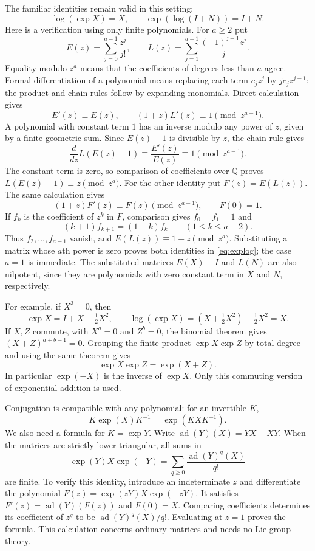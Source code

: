 \documentclass[11pt]{article}
\numberwithin{equation}{section}
\theoremstyle{definition}
\theoremstyle{remark}
\newcommand{\Q}{\mathbb Q}
\newcommand{\ad}{\operatorname{ad}}
\begin{document}
The familiar identities remain valid in this setting:
\begin{equation}\label{eq:explog}
\log(\exp X)=X,\qquad \exp(\log(I+N))=I+N.
\end{equation}
Here is a verification using only finite polynomials. For $a\ge2$ put
\[
E(z)=\sum_{j=0}^{a-1}\frac{z^j}{j!},
\qquad
L(z)=\sum_{j=1}^{a-1}\frac{(-1)^{j+1}z^j}{j}.
\]
Equality modulo $z^a$ means that the coefficients of degrees less than $a$ agree. Formal differentiation of a polynomial means replacing each term $c_jz^j$ by $jc_jz^{j-1}$; the product and chain rules follow by expanding monomials. Direct calculation gives
\[
E'(z)\equiv E(z),\qquad
(1+z)L'(z)\equiv1\pmod{z^{a-1}}.
\]
A polynomial with constant term $1$ has an inverse modulo any power of $z$, given by a finite geometric sum. Since $E(z)-1$ is divisible by $z$, the chain rule gives
\[
\frac{d}{dz}L(E(z)-1)
\equiv\frac{E'(z)}{E(z)}
\equiv1\pmod{z^{a-1}}.
\]
The constant term is zero, so comparison of coefficients over $\Q$ proves $L(E(z)-1)\equiv z\pmod{z^a}$.
For the other identity put $F(z)=E(L(z))$. The same calculation gives
\[
(1+z)F'(z)\equiv F(z)\pmod{z^{a-1}},
\qquad F(0)=1.
\]
If $f_k$ is the coefficient of $z^k$ in $F$, comparison gives $f_0=f_1=1$ and
\[
(k+1)f_{k+1}=(1-k)f_k\qquad(1\le k\le a-2).
\]
Thus $f_2,\ldots,f_{a-1}$ vanish, and $E(L(z))\equiv1+z\pmod{z^a}$. Substituting a matrix whose $a$th power is zero proves both identities in \eqref{eq:explog}; the case $a=1$ is immediate. The substituted matrices $E(X)-I$ and $L(N)$ are also nilpotent, since they are polynomials with zero constant term in $X$ and $N$, respectively.

For example, if $X^3=0$, then
\[
\exp X=I+X+\tfrac12X^2,\qquad
\log(\exp X)=(X+\tfrac12X^2)-\tfrac12X^2=X.
\]
If $X,Z$ commute, with $X^a=0$ and $Z^b=0$, the binomial theorem gives $(X+Z)^{a+b-1}=0$. Grouping the finite product $\exp X\exp Z$ by total degree and using the same theorem gives
\begin{equation}\label{eq:commutingexps}
\exp X\exp Z=\exp(X+Z).
\end{equation}
In particular $\exp(-X)$ is the inverse of $\exp X$. Only this commuting version of exponential addition is used.

Conjugation is compatible with any polynomial: for an invertible $K$,
\[
K\exp(X)K^{-1}=\exp(KXK^{-1}).
\]
We also need a formula for $K=\exp Y$. Write $\ad(Y)(X)=YX-XY$. When the matrices are strictly lower triangular, all sums in
\begin{equation}\label{eq:adconjugation}
\exp(Y)X\exp(-Y)=\sum_{q\ge0}\frac{\ad(Y)^q(X)}{q!}
\end{equation}
are finite. To verify this identity, introduce an indeterminate $z$ and differentiate the polynomial $F(z)=\exp(zY)X\exp(-zY)$. It satisfies $F'(z)=\ad(Y)(F(z))$ and $F(0)=X$. Comparing coefficients determines its coefficient of $z^q$ to be $\ad(Y)^q(X)/q!$. Evaluating at $z=1$ proves the formula. This calculation concerns ordinary matrices and needs no Lie-group theory.
\end{document}
